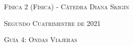 \documentclass[11pt,spanish]{article}
\begin{document}
    \begin{center}
    \textsc{\large Física 2 (Física) - Cátedra Diana Skigin}
    \par\end{center}{\large \par}
    
    \begin{center}
    \textsc{\large Segundo Cuatrimestre de 2021}
    \par\end{center}{\large \par}
    
    \begin{center}
    \textsc{\large Guía 4: Ondas Viajeras}
    \par\end{center}{\large \par}
\end{document}
